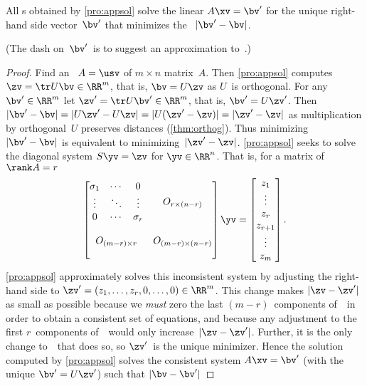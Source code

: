\begin{theorem} \label{thm:appsol} 
All s obtained by \cref{pro:appsol} solve the linear  \(A\xv=\bv'\) for the unique  right-hand side vector~\(\bv'\) 
that minimizes the ~\(|\bv'-\bv|\).
\end{theorem}
(The dash on~\(\bv'\)\ is to suggest an approximation to~\bv.)
\begin{proof} 
Find an \svd\ \(A=\usv\) of \(m\times n\) matrix~\(A\).
Then \cref{pro:appsol} computes \(\zv=\tr U\bv\in\RR^m\), that is, \(\bv=U\zv\) as \(U\)~is orthogonal.
For any \(\bv'\in\RR^m\) let \(\zv'=\tr U\bv'\in\RR^m\), that is, \(\bv'=U\zv'\).
Then \(|\bv'-\bv|=|U\zv'-U\zv|=|U(\zv'-\zv)|=|\zv'-\zv|\) as multiplication by orthogonal~\(U\) preserves distances (\cref{thm:orthog}).
Thus minimizing~\(|\bv'-\bv|\) is equivalent to minimizing~\(|\zv'-\zv|\).
\cref{pro:appsol} seeks to solve the diagonal system \(S\yv=\zv\) for \(\yv\in\RR^n\). 
That is, for a matrix of \(\rank A=r\)
\begin{equation*}
\begin{bmatrix} \begin{matrix} \sigma_1&\cdots&0\\
\vdots&\ddots&\vdots\\
0&\cdots&\sigma_r \end{matrix} & 
O_{r\times (n-r)}\\\,\\
O_{(m-r)\times r}&O_{(m-r)\times (n-r)}
\\\,\end{bmatrix}\yv
=\begin{bmatrix} z_1\\\vdots\\z_r\\z_{r+1}\\\vdots\\z_m \end{bmatrix}.
\end{equation*}
\cref{pro:appsol} approximately solves this inconsistent system by adjusting the right-hand side to \(\zv'=(z_1,\ldots,z_r,0,\ldots,0)\in\RR^m\).
This change makes \(|\zv-\zv'|\) as small as possible because we \emph{must} zero the last \((m-r)\)~components of~\zv\ in order to obtain a consistent set of equations, and because any adjustment to the first \(r\)~components of~\zv\ would only increase~\(|\zv-\zv'|\).
Further, it is the only change to~\zv\ that does so, so \(\zv'\)~is the unique minimizer.
Hence the solution computed by \cref{pro:appsol} solves the consistent system \(A\xv=\bv'\) (with the unique \(\bv'=U\zv'\)) such that \(|\bv-\bv'|\) 
\end{proof}




